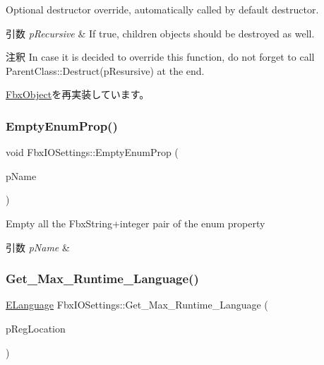 Optional destructor override, automatically called by default destructor. 
\begin{DoxyParams}{引数}
{\em p\+Recursive} & If true, children objects should be destroyed as well. \\
\hline
\end{DoxyParams}
\begin{DoxyRemark}{注釈}
In case it is decided to override this function, do not forget to call Parent\+Class\+::\+Destruct(p\+Resursive) at the end. 
\end{DoxyRemark}


\hyperlink{class_fbx_object_a123e084d9b32b29c28af6384b7c3c608}{Fbx\+Object}を再実装しています。

\mbox{\label{class_fbx_i_o_settings_a6f30f2ea6148cfe5070444c38842ed6f}} 
\subsubsection{\texorpdfstring{Empty\+Enum\+Prop()}{EmptyEnumProp()}}
{\footnotesize\ttfamily void Fbx\+I\+O\+Settings\+::\+Empty\+Enum\+Prop (\begin{DoxyParamCaption}\item[{const char $\ast$}]{p\+Name }\end{DoxyParamCaption})}

Empty all the Fbx\+String+integer pair of the enum property 
\begin{DoxyParams}{引数}
{\em p\+Name} & \\
\hline
\end{DoxyParams}
\mbox{\label{class_fbx_i_o_settings_a253fc042fe3d373a9e1c369ac2d2bd27}} 
\subsubsection{\texorpdfstring{Get\+\_\+\+Max\+\_\+\+Runtime\+\_\+\+Language()}{Get\_Max\_Runtime\_Language()}}
{\footnotesize\ttfamily \hyperlink{class_fbx_i_o_settings_a84f2effd8e41c382faa5ca58046f323f}{E\+Language} Fbx\+I\+O\+Settings\+::\+Get\+\_\+\+Max\+\_\+\+Runtime\+\_\+\+Language (\begin{DoxyParamCaption}\item[{\hyperlink{class_fbx_string}{Fbx\+String}}]{p\+Reg\+Location }\end{DoxyParamCaption})}

